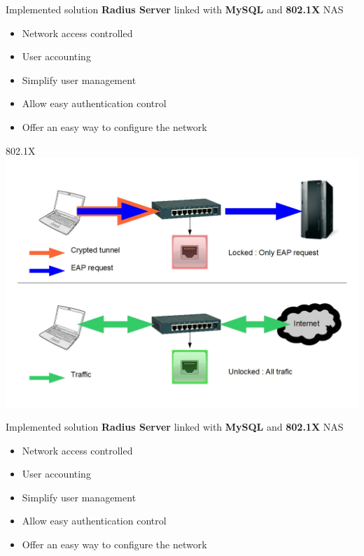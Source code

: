 \documentclass[12pt]{beamer}
\begin{document}
\begin{frame}{Implemented solution}
    \textbf{Radius Server} linked with \textbf{MySQL} and \textbf{802.1X} NAS
    \begin{itemize}
	\item<2-> Network access controlled
	\item<3-> User accounting
    \end{itemize}
    \vfill
    \begin{itemize}
	\item<0> Simplify user management
	\item<0> Allow easy authentication control
	\item<0> Offer an easy way to configure the network
    \end{itemize}
    \vfill
\end{frame}
	
\begin{frame}{802.1X}
    \includegraphics[width=300pts]{img/dot1x.jpg}
\end{frame}

\begin{frame}{Implemented solution}
    \textbf{Radius Server} linked with \textbf{MySQL} and \textbf{802.1X} NAS
    \begin{itemize}
	\item Network access controlled
	\item User accounting
    \end{itemize}
    \vfill
    \begin{itemize}
	\item<3-> Simplify user management
	\item<4-> Allow easy authentication control
	\item<5-> Offer an easy way to configure the network
    \end{itemize}
    \vfill
\end{frame}
\end{document}
